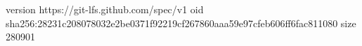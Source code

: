 version https://git-lfs.github.com/spec/v1
oid sha256:28231c208078032e2be0371f92219cf267860aaa59e97cfeb606ff6fac811080
size 280901
